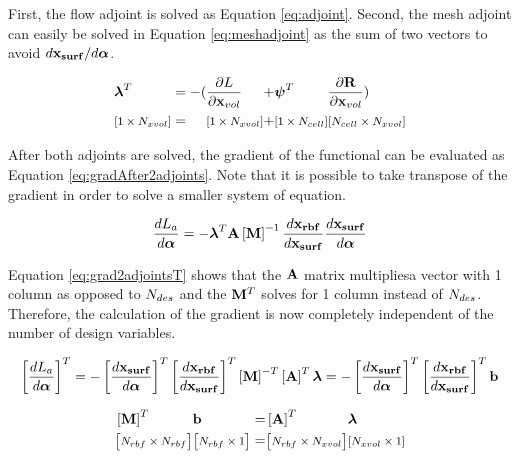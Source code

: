 \documentclass[letterpaper,12pt,]{article}
\begin{document}
First, the flow adjoint is solved as Equation \ref{eq:adjoint}.
Second, the mesh adjoint can easily be solved in Equation \ref{eq:meshadjoint} as the sum of two vectors to avoid $d\mathbf{x_{surf}}/d\boldsymbol{\alpha}$.

\begin{equation}
\begin{alignedat}{6}
	&\boldsymbol{\lambda}^T 
	&&= 
	-(&&\dfrac{\partial L}{\partial\mathbf{x}_{vol}}
	&&+
	&&\boldsymbol{\psi}^T
	&&\dfrac{\partial\mathbf{R}}{\partial\mathbf{x}_{vol}})
\\	                   
	&\text{\footnotesize$\left[1 \times N_{xvol} \right]$}
	&&=
	&& \text{\footnotesize$\left[ 1 \times N_{xvol} \right]$}
	&&+
	&& \text{\footnotesize$\left[ 1 \times N_{cell} \right]$}
	&& \text{\footnotesize$\left[ N_{cell} \times N_{xvol} \right]$}
\label{eq:meshadjoint}
\end{alignedat}
\end{equation}

After both adjoints are solved, the gradient of the functional can be evaluated as Equation \ref{eq:gradAfter2adjoints}.
Note that it is possible to take transpose of the gradient in order to solve a smaller system of equation.

\begin{equation}
	\dfrac{dL_a}{d\boldsymbol{\alpha}}
	=
	-\boldsymbol{\lambda}^T
	\mathbf{A}
	\left[\mathbf{M}\right]^{-1}
	\dfrac{d\mathbf{x_{rbf}}}{d\mathbf{x_{surf}}}
	\dfrac{d\mathbf{x_{surf}}}{d\boldsymbol{\alpha}}
\label{eq:gradAfter2adjoints}
\end{equation}

Equation \ref{eq:grad2adjointsT} shows that the $\mathbf{A}$ matrix multipliesa vector with 1 column as opposed to $N_{des}$ and the $\mathbf{M}^T$ solves for 1 column instead of $N_{des}$.
Therefore, the calculation of the gradient is now completely independent of the number of design variables.

\begin{equation}
	\left[\dfrac{dL_a}{d\boldsymbol{\alpha}}\right]^T
	=
	-\left[\dfrac{d\mathbf{x_{surf}}}{d\boldsymbol{\alpha}}\right]^{T}
	\left[\dfrac{d\mathbf{x_{rbf}}}{d\mathbf{x_{surf}}}\right]^{T}
	\left[\mathbf{M}\right]^{-T}
	\left[\mathbf{A}\right]^{T}
	{\boldsymbol{\lambda}}
	=
	-\left[\dfrac{d\mathbf{x_{surf}}}{d\boldsymbol{\alpha}}\right]^{T}
	\left[\dfrac{d\mathbf{x_{rbf}}}{d\mathbf{x_{surf}}}\right]^{T}
	\mathbf{b}
\label{eq:grad2adjointsT}
\end{equation}

\begin{equation}
\begin{alignedat}{5}
	&\left[\mathbf{M}\right]^{T}
	&&\mathbf{b}
	&&=
	&&\left[\mathbf{A}\right]^{T}
	&&{\boldsymbol{\lambda}}
\\	                   
	&\text{\footnotesize$\left[N_{rbf} \times N_{rbf} \right]$}
	&& \text{\footnotesize$\left[ N_{rbf} \times 1 \right]$}
	&&=
	&& \text{\footnotesize$\left[ N_{rbf} \times N_{xvol} \right]$}
	&& \text{\footnotesize$\left[ N_{xvol} \times 1 \right]$}
\label{eq:meshadjointb}
\end{alignedat}
\end{equation}
\end{document}
